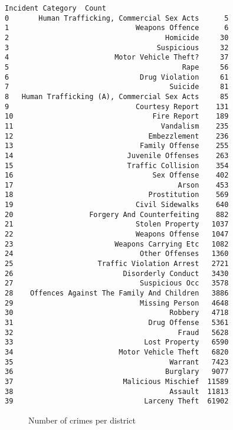 \documentclass[10pt,parskip=half,
toc=sectionentrywithdots,
bibliography=totocnumbered,
captions=tableheading,numbers=noendperiod]{scrartcl}
\begin{document}
\begin{lstlisting}[language={},postbreak={},numbers=none,xrightmargin=7pt,belowskip=5pt,aboveskip=5pt,breakindent=0pt]
                             Incident Category  Count
0       Human Trafficking, Commercial Sex Acts      5
1                              Weapons Offence      6
2                                     Homicide     30
3                                   Suspicious     32
4                         Motor Vehicle Theft?     37
5                                         Rape     56
6                               Drug Violation     61
7                                      Suicide     81
8   Human Trafficking (A), Commercial Sex Acts     85
9                              Courtesy Report    131
10                                 Fire Report    189
11                                   Vandalism    235
12                                Embezzlement    236
13                              Family Offense    255
14                           Juvenile Offenses    263
15                           Traffic Collision    354
16                                 Sex Offense    402
17                                       Arson    453
18                                Prostitution    569
19                             Civil Sidewalks    640
20                  Forgery And Counterfeiting    882
21                             Stolen Property   1037
22                             Weapons Offense   1047
23                        Weapons Carrying Etc   1082
24                              Other Offenses   1360
25                    Traffic Violation Arrest   2721
26                          Disorderly Conduct   3430
27                              Suspicious Occ   3578
28    Offences Against The Family And Children   3886
29                              Missing Person   4648
30                                     Robbery   4718
31                                Drug Offense   5361
32                                       Fraud   5628
33                               Lost Property   6590
34                         Motor Vehicle Theft   6820
35                                     Warrant   7423
36                                    Burglary   9077
37                          Malicious Mischief  11589
38                                     Assault  11813
39                               Larceny Theft  61902

\end{lstlisting}

\begin{figure}[H]\begin{center}\end{center}\caption{Number of crimes per district}\label{fig:barCrimePerDistrict}\end{figure}
\end{document}
